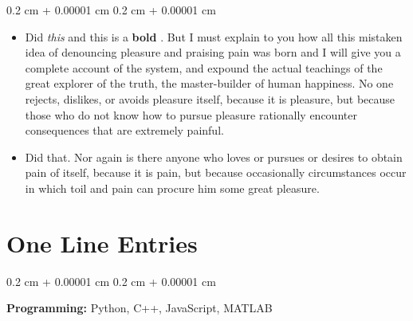 \documentclass[10pt, letterpaper]{article}
\newenvironment{highlights}{
    \begin{itemize}[
        topsep=0.10 cm,
        parsep=0.10 cm,
        partopsep=0pt,
        itemsep=0pt,
        leftmargin=0.4 cm + 10pt
    ]
}{
    \end{itemize}
} %
\newenvironment{onecolentry}{
    \begin{adjustwidth}{
        0.2 cm + 0.00001 cm
    }{
        0.2 cm + 0.00001 cm
    }
}{
    \end{adjustwidth}
} %
\let\hrefWithoutArrow\href
\renewcommand{\href}[2]{\hrefWithoutArrow{#1}{\mbox{\ifthenelse{\equal{#2}{}}{ }{#2 }\raisebox{.15ex}{\footnotesize \faExternalLink*}}}}
\begin{document}
        \vspace{0.10 cm-3px}
        \begin{onecolentry}
            \begin{highlights}
                \item Did \textit{this} and this is a \textbf{bold} \href{https://example.com}{link}. But I must explain to you how all this mistaken idea of denouncing pleasure and praising pain was born and I will give you a complete account of the system, and expound the actual teachings of the great explorer of the truth, the master-builder of human happiness. No one rejects, dislikes, or avoids pleasure itself, because it is pleasure, but because those who do not know how to pursue pleasure rationally encounter consequences that are extremely painful.
                \item Did that. Nor again is there anyone who loves or pursues or desires to obtain pain of itself, because it is pain, but because occasionally circumstances occur in which toil and pain can procure him some great pleasure.
            \end{highlights}
        \end{onecolentry}



    
    \section{One Line Entries}



        
        \begin{onecolentry}
            \textbf{Pro\textnormal{gram}ming:} Python, C++, JavaScript, MATLAB
        \end{onecolentry}


    
\end{document}
